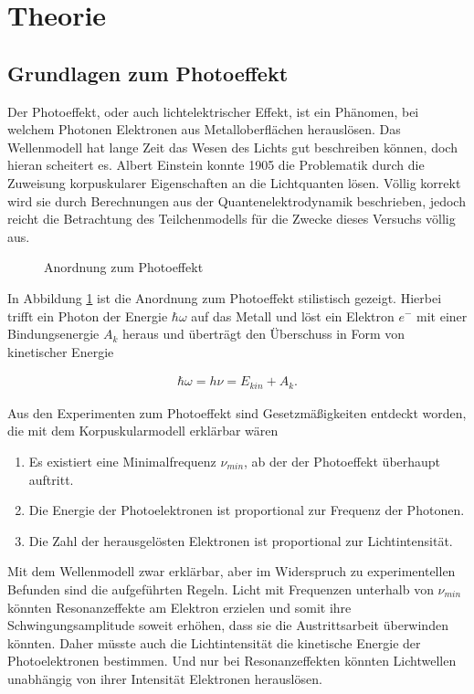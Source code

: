 
\section{Theorie}
\setcounter{page}{1}
\subsection{Grundlagen zum Photoeffekt}
Der Photoeffekt, oder auch lichtelektrischer Effekt, ist ein Phänomen, bei welchem Photonen Elektronen aus Metalloberflächen herauslösen.
Das Wellenmodell hat lange Zeit das Wesen des Lichts gut beschreiben können, doch hieran scheitert es. Albert Einstein konnte 1905 die
Problematik durch die Zuweisung korpuskularer Eigenschaften an die Lichtquanten lösen. Völlig korrekt wird sie durch Berechnungen aus
der Quantenelektrodynamik beschrieben, jedoch reicht die Betrachtung des Teilchenmodells für die Zwecke dieses Versuchs völlig aus.

\begin{figure}[H]
 
 \caption{Anordnung zum Photoeffekt}
 \label{pic_photo}
\end{figure}

In Abbildung \ref{pic_photo} ist die Anordnung zum Photoeffekt stilistisch gezeigt. Hierbei trifft ein Photon der Energie $\hbar\omega$ 
auf das Metall und löst ein Elektron $e^-$ mit einer Bindungsenergie $A_k$ heraus und überträgt den Überschuss in Form von kinetischer 
Energie

\begin{align}
 \hbar\omega = h\nu = E_{kin} + A_k.
 \label{eq_photo}
\end{align}

Aus den Experimenten zum Photoeffekt sind Gesetzmäßigkeiten entdeckt worden, die mit dem Korpuskularmodell erklärbar wären

\begin{enumerate}
 \item Es existiert eine Minimalfrequenz $\nu_{min}$, ab der der Photoeffekt überhaupt auftritt.
 \item Die Energie der Photoelektronen ist proportional zur Frequenz der Photonen.
 \item Die Zahl der herausgelösten Elektronen ist proportional zur Lichtintensität.
\end{enumerate}

Mit dem Wellenmodell zwar erklärbar, aber im Widerspruch zu experimentellen Befunden sind die aufgeführten Regeln. Licht mit Frequenzen
unterhalb von $\nu_{min}$ könnten Resonanzeffekte am Elektron erzielen und somit ihre Schwingungsamplitude soweit erhöhen, dass sie
die Austrittsarbeit überwinden könnten. Daher müsste auch die Lichtintensität die kinetische Energie der Photoelektronen bestimmen. Und
nur bei Resonanzeffekten könnten Lichtwellen unabhängig von ihrer Intensität Elektronen herauslösen.

